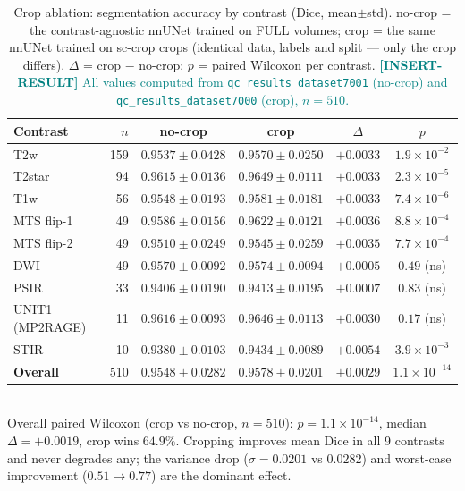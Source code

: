 \documentclass[11pt]{article}
\newcommand{\RESULT}[1]{\textcolor{teal}{\textbf{[INSERT-RESULT]} #1}}
\begin{document}
\begin{table}[t]\centering
  \caption{Crop ablation: segmentation accuracy by contrast (Dice, mean$\pm$std).
  no-crop = the contrast-agnostic nnUNet trained on FULL volumes; crop = the same
  nnUNet trained on sc-crop crops (identical data, labels and split --- only the
  crop differs). $\Delta$ = crop $-$ no-crop; $p$ = paired Wilcoxon per contrast.
  \RESULT{All values computed from \texttt{qc\_results\_dataset7001} (no-crop) and
  \texttt{qc\_results\_dataset7000} (crop), $n=510$.}}
  \label{tab:dice}
  \begin{tabular}{lrcccc}
    \toprule
    Contrast & $n$ & no-crop & crop & $\Delta$ & $p$ \\
    \midrule
    T2w               & 159 & $0.9537\pm0.0428$ & $0.9570\pm0.0250$ & $+0.0033$ & $1.9\times10^{-2}$ \\
    T2star            & 94  & $0.9615\pm0.0136$ & $0.9649\pm0.0111$ & $+0.0033$ & $2.3\times10^{-5}$ \\
    T1w               & 56  & $0.9548\pm0.0193$ & $0.9581\pm0.0181$ & $+0.0033$ & $7.4\times10^{-6}$ \\
    MTS flip-1        & 49  & $0.9586\pm0.0156$ & $0.9622\pm0.0121$ & $+0.0036$ & $8.8\times10^{-4}$ \\
    MTS flip-2        & 49  & $0.9510\pm0.0249$ & $0.9545\pm0.0259$ & $+0.0035$ & $7.7\times10^{-4}$ \\
    DWI               & 49  & $0.9570\pm0.0092$ & $0.9574\pm0.0094$ & $+0.0005$ & $0.49$ (ns) \\
    PSIR              & 33  & $0.9406\pm0.0190$ & $0.9413\pm0.0195$ & $+0.0007$ & $0.83$ (ns) \\
    UNIT1 (MP2RAGE)   & 11  & $0.9616\pm0.0093$ & $0.9646\pm0.0113$ & $+0.0030$ & $0.17$ (ns) \\
    STIR              & 10  & $0.9380\pm0.0103$ & $\mathbf{0.9434\pm0.0089}$ & $+0.0054$ & $3.9\times10^{-3}$ \\
    \midrule
    \textbf{Overall}  & 510 & $0.9548\pm0.0282$ & $\mathbf{0.9578\pm0.0201}$ & $+0.0029$ & $1.1\times10^{-14}$ \\
    \bottomrule
  \end{tabular}
  \\[2pt]\footnotesize Overall paired Wilcoxon (crop vs no-crop, $n=510$):
  $p=1.1\times10^{-14}$, median $\Delta=+0.0019$, crop wins $64.9\%$. Cropping
  improves mean Dice in all 9 contrasts and never degrades any; the variance drop
  ($\sigma=0.0201$ vs $0.0282$) and worst-case improvement ($0.51\rightarrow0.77$)
  are the dominant effect.
\end{table}
\end{document}
